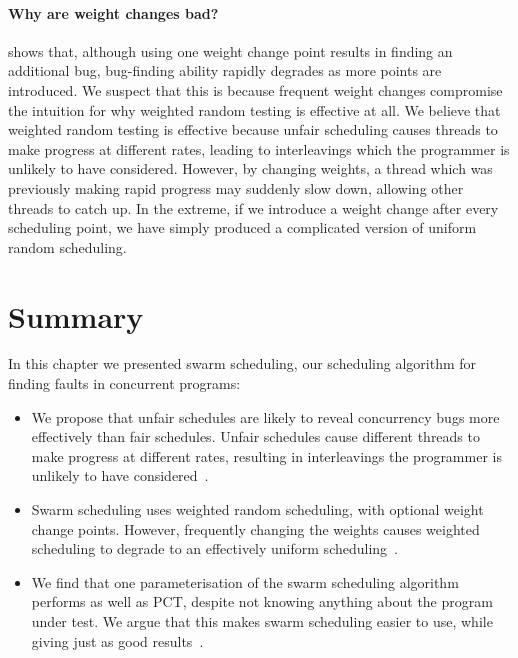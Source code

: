 \paragraph{Why are weight changes bad?}
 shows that, although using one weight change
point results in finding an additional bug, bug-finding ability
rapidly degrades as more points are introduced.  We suspect that this
is because frequent weight changes compromise the intuition for why
weighted random testing is effective at all.  We believe that weighted
random testing is effective because unfair scheduling causes threads
to make progress at different rates, leading to interleavings which
the programmer is unlikely to have considered.  However, by changing
weights, a thread which was previously making rapid progress may
suddenly slow down, allowing other threads to catch up.  In the
extreme, if we introduce a weight change after every scheduling point,
we have simply produced a complicated version of uniform random
scheduling.

\section{Summary}

In this chapter we presented swarm scheduling, our scheduling
algorithm for finding faults in concurrent programs:

\begin{itemize}
\item We propose that unfair schedules are likely to reveal
  concurrency bugs more effectively than fair schedules.  Unfair
  schedules cause different threads to make progress at different
  rates, resulting in interleavings the programmer is unlikely to have
  considered~.

\item Swarm scheduling uses weighted random scheduling, with optional
  weight change points.  However, frequently changing the weights
  causes weighted scheduling to degrade to an effectively uniform
  scheduling~.

\item We find that one parameterisation of the swarm scheduling
  algorithm performs as well as PCT\cite{burckhardt2010}, despite not
  knowing anything about the program under test.  We argue that this
  makes swarm scheduling easier to use, while giving just as good
  results~.
\end{itemize}

